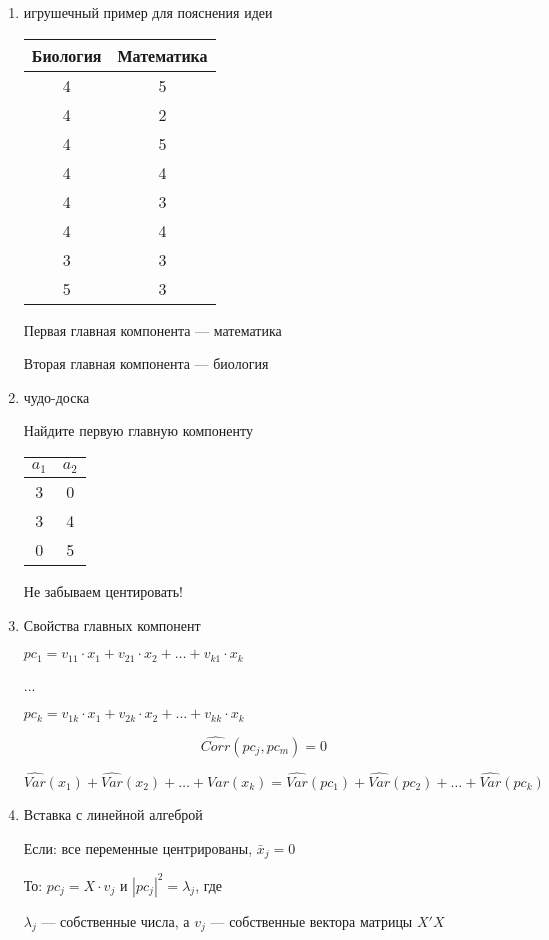 \documentclass[12pt,a4paper]{article}
\begin{document}
{\begin{enumerate}
\item игрушечный пример для пояснения идеи

\begin{tabular}{cc}
Биология & Математика \\ 
\hline 
4 & 5 \\ 
4 & 2 \\ 
4 & 5 \\ 
4 & 4 \\ 
4 & 3 \\ 
4 & 4 \\ 
3 & 3 \\ 
5 & 3 \\ 
\end{tabular} 

Первая главная компонента --- математика

Вторая главная компонента --- биология

\item чудо-доска

Найдите первую главную компоненту

\begin{tabular}{cc}
$a_1$ & $a_2$ \\ 
\hline 
3 & 0 \\ 
3 & 4 \\ 
0 & 5 \\ 
\end{tabular} 

Не забываем центировать! 

\item Свойства главных компонент

$pc_1=v_{11} \cdot x_1 +  v_{21} \cdot x_2 + \ldots + v_{k1} \cdot x_k$

...

$pc_k=v_{1k} \cdot x_1 +  v_{2k} \cdot x_2 + \ldots + v_{kk} \cdot x_k$


\[
\widehat{Corr}(pc_j,pc_m)=0
\]
 
\[
\widehat{Var}(x_1)+ \widehat{Var}(x_2) + \ldots + \widehat{Var}(x_k) =
\widehat{Var}(pc_1)+ \widehat{Var}(pc_2) + \ldots + \widehat{Var}(pc_k)
\]



\item Вставка с линейной алгеброй

Если: все переменные центрированы, $\bar{x}_j=0$

То: $pc_j=X \cdot v_j$ и $|pc_j|^2=\lambda_j$, где

$\lambda_j$ --- собственные числа, а $v_{j}$ --- собственные вектора матрицы $X'X$


\end{enumerate}}
\end{document}
